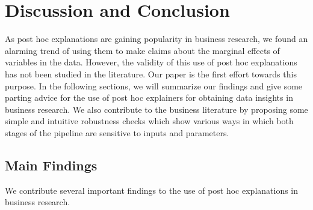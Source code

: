 \documentclass[mnsc,blindrev]{informs3}
\begin{document}
\section{Discussion and Conclusion}
    \label{sec:discussion}
    As post hoc explanations are gaining popularity in business research, we found an alarming trend of using them to make claims about the marginal effects of variables in the data.  However, the validity of this use of post hoc explanations has not been studied in the literature. 
    Our paper is the first effort towards this purpose. 
     In the following sections, we will summarize our findings and give some parting advice for the use of post hoc explainers for obtaining data insights in business research. 
    We also contribute to the business literature by proposing some simple and intuitive robustness checks which show various ways in which both stages of the pipeline are sensitive to inputs and parameters. 


    \subsection{Main Findings}
        We contribute several important findings to the use of post hoc explanations in business research.
\end{document}

